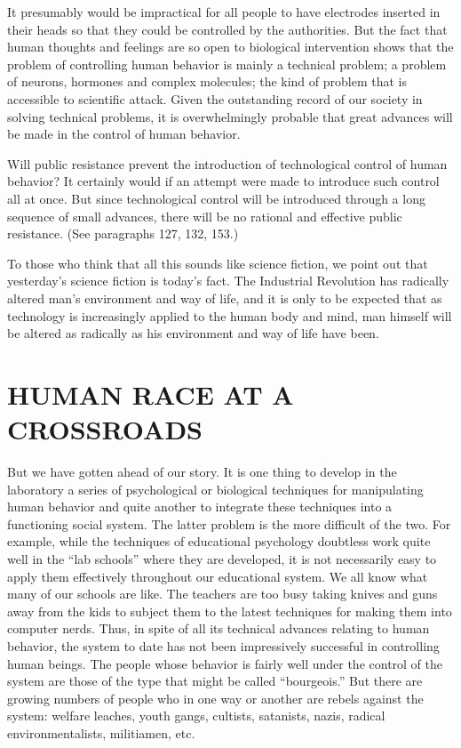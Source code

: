  It presumably would be impractical for all people to have electrodes inserted in their heads so that they could be controlled by the authorities. But the fact that human thoughts and feelings are so open to biological intervention shows that the problem of controlling human behavior is mainly a technical problem; a problem of neurons, hormones and complex molecules; the kind of problem that is accessible to scientific attack. Given the outstanding record of our society in solving technical problems, it is overwhelmingly probable that great advances will be made in the control of human behavior.

 Will public resistance prevent the introduction of technological control of human behavior? It certainly would if an attempt were made to introduce such control all at once. But since technological control will be introduced through a long sequence of small advances, there will be no rational and effective public resistance. (See paragraphs 127, 132, 153.)

 To those who think that all this sounds like science fiction, we point out that yesterday’s science fiction is today’s fact. The Industrial Revolution has radically altered man’s environment and way of life, and it is only to be expected that as technology is increasingly applied to the human body and mind, man himself will be altered as radically as his environment and way of life have been.

\chapter{HUMAN RACE AT A CROSSROADS}

 But we have gotten ahead of our story. It is one thing to develop in the laboratory a series of psychological or biological techniques for manipulating human behavior and quite another to integrate these techniques into a functioning social system. The latter problem is the more difficult of the two. For example, while the techniques of educational psychology doubtless work quite well in the “lab schools” where they are developed, it is not necessarily easy to apply them effectively throughout our educational system. We all know what many of our schools are like. The teachers are too busy taking knives and guns away from the kids to subject them to the latest techniques for making them into computer nerds. Thus, in spite of all its technical advances relating to human behavior, the system to date has not been impressively successful in controlling human beings. The people whose behavior is fairly well under the control of the system are those of the type that might be called “bourgeois.” But there are growing numbers of people who in one way or another are rebels against the system: welfare leaches, youth gangs, cultists, satanists, nazis, radical environmentalists, militiamen, etc.

